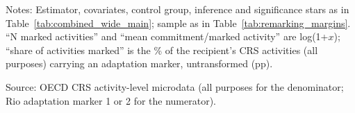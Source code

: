\begin{table}[H]
\centering
\caption{Counts vs.\ values: extensive and intensive margins of adaptation marking}
\label{tab:remarking_counts}
\begingroup\small
{}
\endgroup
\par\vspace{4pt}
\begin{minipage}{\linewidth}\footnotesize
Notes: Estimator, covariates, control group, inference and significance stars as in Table~\ref{tab:combined_wide_main}; sample as in Table~\ref{tab:remarking_margins}. ``N marked activities'' and ``mean commitment/marked activity'' are log(1+$x$); ``share of activities marked'' is the \% of the recipient's CRS activities (all purposes) carrying an adaptation marker, untransformed (pp).\par
Source: OECD CRS activity-level microdata (all purposes for the denominator; Rio adaptation marker 1 or 2 for the numerator).
\end{minipage}
\end{table}
